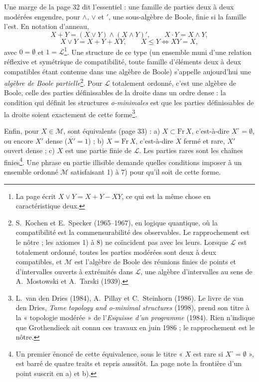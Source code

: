 \documentclass[11pt,a4paper]{article}
\begin{document}
Une marge de la page 32 dit l'essentiel : une famille de parties deux à deux
modérées engendre, pour $\wedge$, $\vee$ et $'$, une sous-algèbre de Boole,
finie si la famille l'est. En notation d'anneau,
\[
X + Y = (X \vee Y) \wedge (X \wedge Y)', \qquad X \cdot Y = X \wedge Y,
\]
\[
X \vee Y = X + Y + XY, \qquad X \leq Y \iff XY = X,
\]
avec $0 = \emptyset$ et $1 = \mathcal{L}$\footnote{La page écrit $X \vee Y = X + Y
- XY$, ce qui est la même chose en caractéristique deux.}.
Une structure de ce type (un ensemble muni d'une relation réflexive et
symétrique de compatibilité, toute famille d'éléments deux à deux compatibles
étant contenue dans une algèbre de Boole) s'appelle aujourd'hui une
\emph{algèbre de Boole partielle}\footnote{S.~Kochen et E.~Specker (1965--1967),
en logique quantique, où la compatibilité est la commensurabilité des
observables. Le rapprochement est le nôtre ; les axiomes 1) à 8) ne coïncident
pas avec les leurs. Lorsque $\mathcal{L}$ est totalement ordonné, toutes les
parties modérées sont deux à deux compatibles, et $\mathcal{M}$ est l'algèbre
de Boole des réunions finies de points et d'intervalles ouverts à extrémités
dans $\mathcal{L}$, une algèbre d'intervalles au sens de A.~Mostowski et
A.~Tarski (1939).}. Pour $\mathcal{L}$ totalement ordonné, c'est une algèbre de
Boole, celle des parties définissables de la droite dans un ordre dense : la
condition qui définit les structures \emph{o-minimales} est que les parties
définissables de la droite soient exactement de cette forme\footnote{L.~van den
Dries (1984), A.~Pillay et C.~Steinhorn (1986). Le livre de van den Dries,
\emph{Tame topology and o-minimal structures} (1998), prend son titre à la
« topologie modérée » de l'\emph{Esquisse d'un programme} (1984). Rien
n'indique que Grothendieck ait connu ces travaux en juin 1986 ; le rapprochement
est le nôtre.}.

Enfin, pour $X \in \mathcal{M}$, sont équivalents (page 33) : a) $X \subset
\mathrm{Fr}\, X$, c'est-à-dire $X^{\circ} = \emptyset$, ou encore $X'$ dense
($\overline{X'} = 1$) ; b) $X = \mathrm{Fr}\, X$, c'est-à-dire $X$ fermé et
rare, $X'$ ouvert dense ; c) $X$ est une partie finie de $\mathcal{L}$. Les
parties rares sont les chaînes finies\footnote{Un premier énoncé de cette
équivalence, sous le titre « $X$ est rare si $X^{\circ} = \emptyset$ », est
barré de quatre traits et repris aussitôt. La page note la frontière d'un point
suscrit en a) et b).}. Une phrase en partie illisible demande quelles
conditions imposer à un ensemble ordonné $\mathcal{M}$ satisfaisant 1) à 7)
pour qu'il soit de cette forme.
\end{document}
